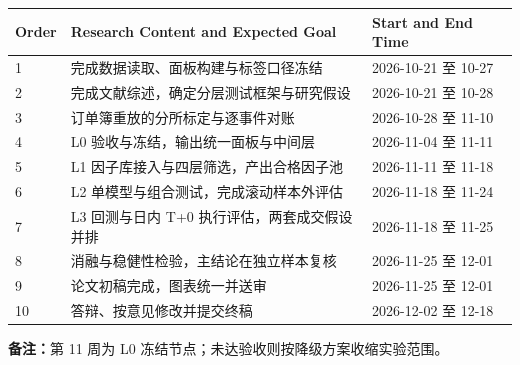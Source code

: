 \documentclass[11pt,a4paper]{article}
\begin{document}
\begin{table}
\begin{tabular}{lll}
\toprule
Order & Research Content and Expected Goal & Start and End Time \\
\midrule
1 & 完成数据读取、面板构建与标签口径冻结 & 2026-10-21 至 10-27 \\
2 & 完成文献综述，确定分层测试框架与研究假设 & 2026-10-21 至 10-28 \\
3 & 订单簿重放的分所标定与逐事件对账 & 2026-10-28 至 11-10 \\
4 & L0 验收与冻结，输出统一面板与中间层 & 2026-11-04 至 11-11 \\
5 & L1 因子库接入与四层筛选，产出合格因子池 & 2026-11-11 至 11-18 \\
6 & L2 单模型与组合测试，完成滚动样本外评估 & 2026-11-18 至 11-24 \\
7 & L3 回测与日内 T+0 执行评估，两套成交假设并排 & 2026-11-18 至 11-25 \\
8 & 消融与稳健性检验，主结论在独立样本复核 & 2026-11-25 至 12-01 \\
9 & 论文初稿完成，图表统一并送审 & 2026-11-25 至 12-01 \\
10 & 答辩、按意见修改并提交终稿 & 2026-12-02 至 12-18 \\
\bottomrule
\end{tabular}
\end{table}


\noindent\textbf{备注：}第 11 周为 L0 冻结节点；未达验收则按降级方案收缩实验范围。
\end{document}
